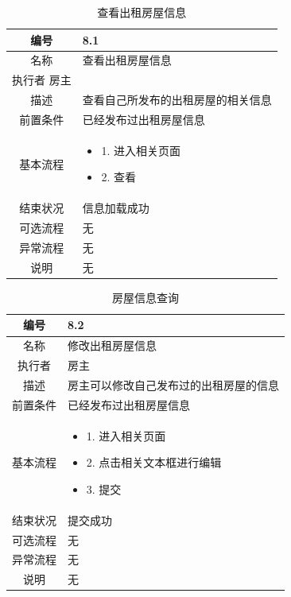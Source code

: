 \begin{table}[htbp]
	\centering
	\begin{tabular}{|c|p{11cm}|}
        \hline
        编号 & 8.1 \\
        \hline
        名称 & 查看出租房屋信息 \\ 
        \hline
        执行者  房主 \\
        \hline
        描述 & 查看自己所发布的出租房屋的相关信息\\
        \hline
        前置条件 & 已经发布过出租房屋信息 \\
        \hline
        基本流程 & \begin{itemize}
            \item 1. 进入相关页面
            \item 2. 查看
 
        \end{itemize} \\
        \hline
        结束状况 & 信息加载成功 \\
        \hline
        可选流程 & 无 \\
        \hline
        异常流程 & 无 \\
        \hline
        说明 & 无 \\
        \hline
    \end{tabular}
    \caption{查看出租房屋信息}
\end{table}

\begin{table}[htbp]
	\centering
	\begin{tabular}{|c|p{11cm}|}
        \hline
        编号 & 8.2 \\
        \hline
        名称 & 修改出租房屋信息 \\ 
        \hline
        执行者 & 房主 \\
        \hline
        描述 & 房主可以修改自己发布过的出租房屋的信息 \\
        \hline
        前置条件 & 已经发布过出租房屋信息 \\
        \hline
        基本流程 & \begin{itemize}
            \item 1. 进入相关页面
            \item 2. 点击相关文本框进行编辑
            \item 3. 提交
        \end{itemize} \\
        \hline
        结束状况 & 提交成功 \\
        \hline
        可选流程 & 无 \\
        \hline
        异常流程 & 无 \\
        \hline
        说明 & 无 \\
        \hline
    \end{tabular}
    \caption{房屋信息查询}
\end{table}

